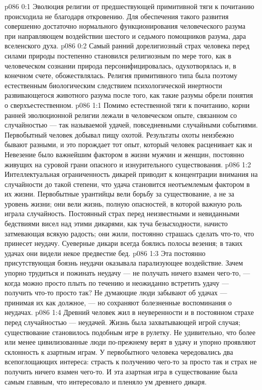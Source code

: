 \author{Вечерняя Звезда}
\vs p086 0:1 Эволюция религии от предшествующей примитивной тяги к почитанию происходила не благодаря откровению. Для обеспечения такого развития совершенно достаточно нормального функционирования человеческого разума при направляющем воздействии шестого и седьмого помощников разума, дара вселенского духа.
\vs p086 0:2 Самый ранний дорелигиозный страх человека перед силами природы постепенно становился религиозным по мере того, как в человеческом сознании природа персонифицировалась, одухотворялась и, в конечном счете, обожествлялась. Религия примитивного типа была поэтому естественным биологическим следствием психологической инертности развивающегося животного разума после того, как такие разумы обрели понятия о сверхъестественном.
\vs p086 1:1 Помимо естественной тяги к почитанию, корни ранней эволюционной религии лежали в человеческом опыте, связанном со случайностью --- так называемой удачей, повседневными случайными событиями. Первобытный человек добывал пищу охотой. Результаты охоты неизбежно бывают разными, и это порождает тот опыт, который человек расценивает как  и  Невезение было важнейшим фактором в жизни мужчин и женщин, постоянно живущих на суровой грани опасного и изнурительного существования.
\vs p086 1:2 Интеллектуальная ограниченность дикарей приводит к концентрации внимания на случайности до такой степени, что удача становится неотъемлемым фактором в их жизни. Первобытные урантийцы вели борьбу за существование, а не за уровень жизни; они вели жизнь, полную опасностей, в которой важную роль играла случайность. Постоянный страх перед неизвестными и невиданными бедствиями висел над этими дикарями, как туча безысходности, начисто затмевающая всякую радость; они жили, постоянно страшась сделать что\hyp{}то, что принесет неудачу. Суеверные дикари всегда боялись полосы везения; в таких удачах они видели некое предвестие бед.
\vs p086 1:3 Эта постоянно присутствующая боязнь неудачи оказывала парализующее воздействие. Зачем упорно трудиться и пожинать неудачу --- не получать ничего взамен чего\hyp{}то, --- когда можно просто плыть по течению и неожиданно встретить удачу --- получить что\hyp{}то просто так? Не думающие люди забывают об удачах --- принимая их как должное, --- но сохраняют болезненные воспоминания о неудачах.
\vs p086 1:4 Древний человек жил в неуверенности и в постоянном страхе перед случайностью --- неудачей. Жизнь была захватывающей игрой случая; существование становилось подобным игре в рулетку. Не удивительно, что более или менее цивилизованные люди по\hyp{}прежнему верят в удачу и упорно проявляют склонность к азартным играм. У первобытного человека чередовались два всепоглощающих интереса: страсть к получению чего\hyp{}то за просто так и страх не получить ничего взамен чего\hyp{}то. И эта азартная игра в существование была самым главным, что интересовало и пленяло ум древнего дикаря.
